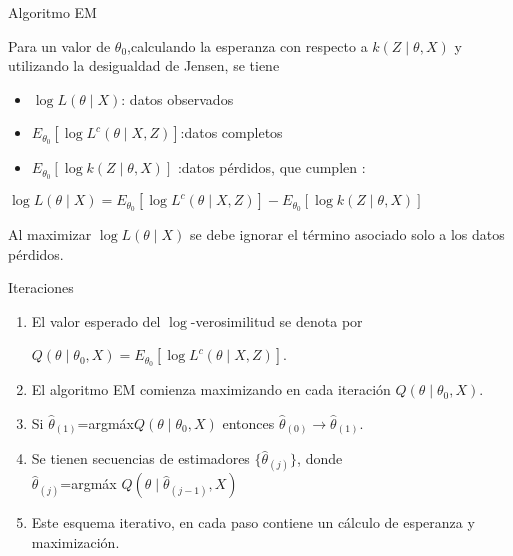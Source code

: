 \documentclass[utf8,spanish,xcolor={table,dvipsnames},12pt]{beamer}
\begin{document}
\begin{frame}{Algoritmo EM}

Para un valor de $\theta_{0}$,calculando la esperanza con respecto a $k(Z\mid\theta,X)$
y utilizando la desigualdad de Jensen, se tiene

\vspace{0.2cm}

\begin{itemize}
	\item $\log L(\theta\mid X)$: datos observados
	\item $E_{\theta_{0}}[\log L^{c}(\theta\mid X,Z)]$:datos completos
	\item $E_{\theta_{0}}[\log k(Z\mid\theta,X)]$ :datos pérdidos, que cumplen :
\end{itemize}

\vspace{0.2cm}

\begin{center}
	$\log L(\theta\mid X)=E_{\theta_{0}}[\log L^{c}(\theta\mid X,Z)]-E_{\theta_{0}}[\log k(Z\mid\theta,X)]$ 
\end{center}
\vspace{0.2cm}

Al maximizar $\log L(\theta\mid X)$ se debe ignorar el término asociado solo a los datos pérdidos.
\end{frame}





\begin{frame}{Iteraciones}

\begin{enumerate}
  \item El valor esperado del $\log$-verosimilitud se denota por
   \begin{center}
     $ Q(\theta\mid\theta_{0},X)=E_{\theta_{0}}[\log L^{c}(\theta\mid X,Z)]$.
   \end{center}
   
  \item El algoritmo EM comienza maximizando en cada iteración $Q(\theta\mid\theta_{0},X)$.
  \item Si $\hat{\theta}_{(1)}$=argmáx$Q(\theta\mid\theta_{0},X)$ entonces $\hat{\theta}_{(0)}\rightarrow \hat{\theta}_{(1)}$.
  \item Se tienen secuencias de estimadores $\{\hat{\theta}_{(j)}\}$, donde \\
        $ \hat{\theta}_{(j)}$=argmáx $Q(\theta\mid\hat{\theta}_{(j-1)},X)$   
  \item Este esquema iterativo, en cada paso contiene un cálculo de esperanza y maximización.
  
\end{enumerate}
\end{frame}
\end{document}
